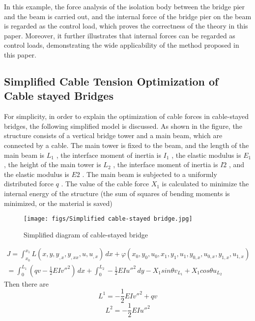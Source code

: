 In this example, the force analysis of the isolation body between the bridge pier and the beam is carried out, and the internal force of the bridge pier on the beam is regarded as the control load, which proves the correctness of the theory in this paper. Moreover, it further illustrates that internal forces can be regarded as control loads, demonstrating the wide applicability of the method proposed in this paper.

\subsection {Simplified Cable Tension Optimization of Cable stayed Bridges}
For simplicity, in order to explain the optimization of cable forces in cable-stayed bridges, the following simplified model is discussed. As shown in the figure, the structure consists of a vertical bridge tower and a main beam, which are connected by a cable. The main tower is fixed to the beam, and the length of the main beam is $ L_1 $ , the interface moment of inertia is $ I_1 $ , the elastic modulus is $ E_1 $ , the height of the main tower is $ L_2 $ , the interface moment of inertia is $ I2 $ , and the elastic modulus is $ E2 $ . The main beam is subjected to a uniformly distributed force $ q $ . The value of the cable force $ X_1 $ is calculated to minimize the internal energy of the structure (the sum of squares of bending moments is minimized, or the material is saved)
\begin{figure}[h!] %
    \centering
    \texttt{[image: figs/Simplified cable-stayed bridge.jpg]} 
    \caption{Simplified diagram of cable-stayed bridge}
    \label{fig:number}
\end{figure} 
\begin{multline}\label{eq:(example.xlq.1)}
J = \int_{x_{0}}^{x_{1}} L(x,y,y_{,x},y_{,xx},u,u_{,x})\,dx+\varphi(x_{0},y_{0},u_{0},x_{1},y_{1},u_{1},y_{0,x},u_{0,x},y_{1,x},u_{1,x})\\
=\int_{0}^{L_1} (qv-\frac{1} {2}EIv ''^2)\,dx+\int_{0}^{L_2} -\frac{1} {2}EIu ''^2\,dy-X_1 sin\theta v_{L_1}+X_1 cos\theta u_{L_2}
\end{multline}
Then there are
\begin{equation} \label{eq:(example.xlq.2)}    
L^1=-\frac{1} {2}EIv ''^2+qv
\end{equation}
\begin{equation} \label{eq:(example.xlq.3)}    
L^2=-\frac{1} {2}EIu ''^2
\end{equation}
